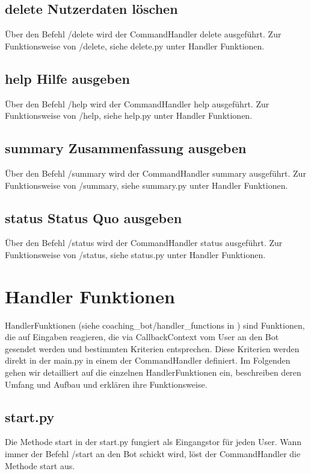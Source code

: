         \subsection{delete \- Nutzerdaten löschen}
            Über den Befehl /delete wird der CommandHandler delete ausgeführt. Zur Funktionsweise von /delete, siehe delete.py unter Handler Funktionen. 


        \subsection{help \- Hilfe ausgeben}
            Über den Befehl /help wird der CommandHandler help ausgeführt. Zur Funktionsweise von /help, siehe help.py unter Handler Funktionen. 


        \subsection{summary \- Zusammenfassung ausgeben}
            Über den Befehl /summary wird der CommandHandler summary ausgeführt. Zur Funktionsweise von /summary, siehe summary.py unter Handler Funktionen. 


        \subsection{status \- Status Quo ausgeben}
            Über den Befehl /status wird der CommandHandler status ausgeführt. Zur Funktionsweise von /status, siehe status.py unter Handler Funktionen. 


    \section{Handler Funktionen}
        Handler\-Funktionen (siehe coaching\_bot/handler\_functions in \cite{repo}) sind Funktionen, die auf Eingaben reagieren, die via CallbackContext vom User an den Bot gesendet werden und bestimmten Kriterien entsprechen. Diese Kriterien werden direkt in der main.py in einem der CommandHandler definiert. Im Folgenden gehen wir detailliert auf die einzelnen Handler\-Funktionen ein, beschreiben deren Umfang und Aufbau und erklären ihre Funktionsweise. 

        \subsection{start.py}
            Die Methode start in der start.py fungiert als Eingangstor für jeden User. Wann immer der Befehl /start an den Bot schickt wird, löst der CommandHandler die Methode start aus.

